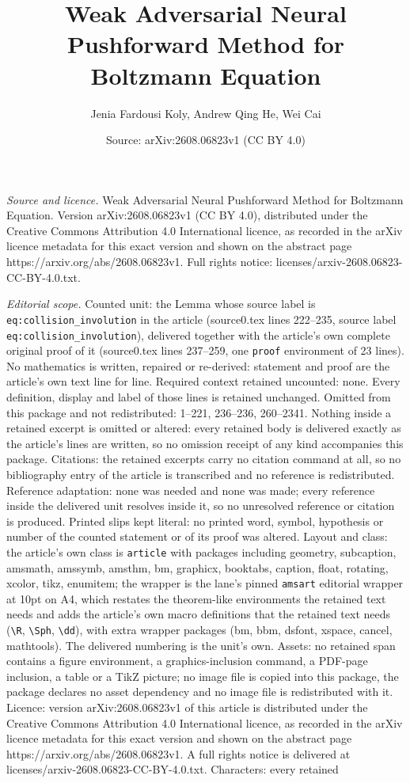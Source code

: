 \documentclass[10pt,a4paper]{amsart}
\title[Weak Adversarial Neural Pushforward Method for Boltzmann Equ]{Weak Adversarial Neural Pushforward Method for Boltzmann Equation}
\author{Jenia Fardousi Koly, Andrew Qing He, Wei Cai}
\date{Source: arXiv:2608.06823v1 (CC BY 4.0)}
\begin{document}
\maketitle

\noindent\emph{Source and licence.} Weak Adversarial Neural Pushforward Method for Boltzmann Equation. Version arXiv:2608.06823v1 (CC BY 4.0), distributed under the Creative Commons Attribution 4.0 International licence, as recorded in the arXiv licence metadata for this exact version and shown on the abstract page https://arxiv.org/abs/2608.06823v1. Full rights notice: licenses/arxiv-2608.06823-CC-BY-4.0.txt.\par\smallskip

\noindent\textit{Editorial scope.} Counted unit: the Lemma whose source label is \texttt{eq:collision\_involution} in the article (source0.tex lines 222--235, source label \texttt{eq:collision\_involution}), delivered together with the article's own complete original proof of it (source0.tex lines 237--259, one \texttt{proof} environment of 23 lines). No mathematics is written, repaired or re-derived: statement and proof are the article's own text line for line. Required context retained uncounted: none. Every definition, display and label of those lines is retained unchanged. Omitted from this package and not redistributed: 1--221, 236--236, 260--2341. Nothing inside a retained excerpt is omitted or altered: every retained body is delivered exactly as the article's lines are written, so no omission receipt of any kind accompanies this package. Citations: the retained excerpts carry no citation command at all, so no bibliography entry of the article is transcribed and no reference is redistributed. Reference adaptation: none was needed and none was made; every reference inside the delivered unit resolves inside it, so no unresolved reference or citation is produced. Printed slips kept literal: no printed word, symbol, hypothesis or number of the counted statement or of its proof was altered. Layout and class: the article's own class is \texttt{article} with packages including geometry, subcaption, amsmath, amssymb, amsthm, bm, graphicx, booktabs, caption, float, rotating, xcolor, tikz, enumitem; the wrapper is the lane's pinned \texttt{amsart} editorial wrapper at 10pt on A4, which restates the theorem-like environments the retained text needs and adds the article's own macro definitions that the retained text needs (\texttt{\textbackslash R}, \texttt{\textbackslash Sph}, \texttt{\textbackslash dd}), with extra wrapper packages (bm, bbm, dsfont, xspace, cancel, mathtools). The delivered numbering is the unit's own. Assets: no retained span contains a figure environment, a graphics-inclusion command, a PDF-page inclusion, a table or a TikZ picture; no image file is copied into this package, the package declares no asset dependency and no image file is redistributed with it. Licence: version arXiv:2608.06823v1 of this article is distributed under the Creative Commons Attribution 4.0 International licence, as recorded in the arXiv licence metadata for this exact version and shown on the abstract page https://arxiv.org/abs/2608.06823v1. A full rights notice is delivered at licenses/arxiv-2608.06823-CC-BY-4.0.txt. Characters: every retained 
\end{document}
